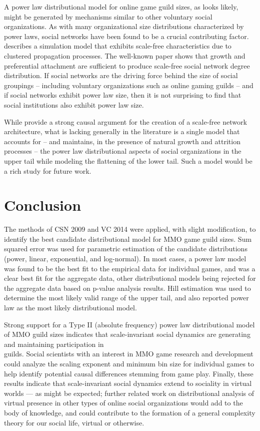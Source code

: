 \documentclass[pdftex,12pt]{llncs}
\begin{document}
A power law distributional model for online game guild sizes, as looks likely, might be generated by mechanisms similar to other voluntary social organizations.
As with many organizational size distributions characterized by power laws, social networks have been found to be a crucial contributing factor.
\parencite{liljeros2008} describes a simulation model that exhibits scale-free characteristics due to clustered propagation processes.
The well-known \parencite{BA1999} paper shows that growth and preferential attachment are sufficient to produce scale-free social network degree distribution.
If social networks are the driving force behind the size of social groupings – including voluntary organizations such as online gaming guilds – and if social networks exhibit power law size, then it is not surprising to find that social institutions also exhibit power law size.

While \parencite{BA1999} provide a strong causal argument for the creation of a scale-free network architecture, what is lacking generally in the literature is a single model that accounts for – and maintains, in the presence of natural growth and attrition processes – the power law distributional aspects of social organizations in the upper tail while modeling the flattening of the lower tail.
Such a model would be a rich study for future work.

\section{Conclusion}
The methods of CSN 2009 and VC 2014 were applied, with slight modification, to identify the best candidate distributional model for MMO game guild sizes.
Sum squared error was used for parametric estimation of the candidate distributions (power, linear, exponential, and log-normal). 
In most cases, a power law model was found to be the best fit to the empirical data for individual games, and was a clear best fit for the aggregate data, other distributional models being rejected for the aggregate data based on p-value analysis results.
Hill estimation was used to determine the most likely valid range of the upper tail, and also reported power law as the most likely distributional model.

Strong support for a Type II (absolute frequency) power law distributional model of MMO guild sizes indicates that scale-invariant social dynamics are generating and maintaining participation in\\guilds.
Social scientists with an interest in MMO game research and development could analyze the scaling exponent and minimum bin size for individual games to help identify potential causal differences stemming from game play.
Finally, these results indicate that scale-invariant social dynamics extend to sociality in virtual worlds --- as might be expected; further related work on distributional analysis of virtual presence in other types of online social organizations would add to the body of knowledge, and could contribute to the formation of a general complexity theory for our social life, virtual or otherwise.

\printbibliography
\end{document}
